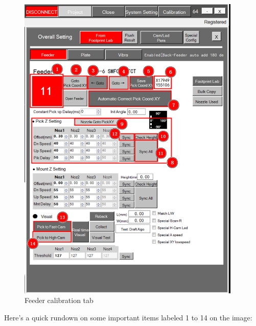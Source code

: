 \documentclass[a4paper,10pt]{report}
\begin{document}
\begin{figure}[!htb]
 \centering
 \includegraphics[width=0.95\textwidth]{scrot21.png}
 \caption{Feeder calibration tab}
\end{figure}
\newpage
Here's a quick rundown on some important items labeled 1 to 14 on the image:\\
\end{document}
